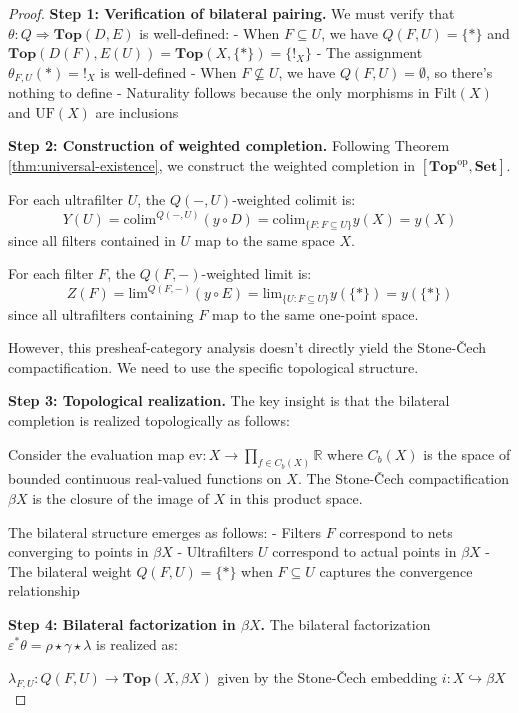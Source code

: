 \documentclass[11pt]{article}
\theoremstyle{plain}
\theoremstyle{definition}
\theoremstyle{remark}
\newcommand{\op}{\mathrm{op}}
\newcommand{\colim}{\mathrm{colim}}
\renewcommand{\lim}{\mathrm{lim}}
\begin{document}
\begin{proof}
\textbf{Step 1: Verification of bilateral pairing.}
We must verify that $\theta : Q \Rightarrow \mathbf{Top}(D, E)$ is well-defined:
- When $F \subseteq U$, we have $Q(F, U) = \{*\}$ and $\mathbf{Top}(D(F), E(U)) = \mathbf{Top}(X, \{*\}) = \{!_X\}$
- The assignment $\theta_{F,U}(*) = !_X$ is well-defined
- When $F \not\subseteq U$, we have $Q(F, U) = \emptyset$, so there's nothing to define
- Naturality follows because the only morphisms in $\mathrm{Filt}(X)$ and $\mathrm{UF}(X)$ are inclusions

\textbf{Step 2: Construction of weighted completion.}
Following Theorem \ref{thm:universal-existence}, we construct the weighted completion in $[\mathbf{Top}^{\op}, \mathbf{Set}]$.

For each ultrafilter $U$, the $Q(-, U)$-weighted colimit is:
$$Y(U) = \colim^{Q(-, U)} (y \circ D) = \colim_{\{F : F \subseteq U\}} y(X) = y(X)$$
since all filters contained in $U$ map to the same space $X$.

For each filter $F$, the $Q(F, -)$-weighted limit is:
$$Z(F) = \lim^{Q(F, -)} (y \circ E) = \lim_{\{U : F \subseteq U\}} y(\{*\}) = y(\{*\})$$
since all ultrafilters containing $F$ map to the same one-point space.

However, this presheaf-category analysis doesn't directly yield the Stone-\v{C}ech compactification. We need to use the specific topological structure.

\textbf{Step 3: Topological realization.}
The key insight is that the bilateral completion is realized topologically as follows:

Consider the evaluation map $\text{ev} : X \to \prod_{f \in C_b(X)} \mathbb{R}$ where $C_b(X)$ is the space of bounded continuous real-valued functions on $X$. The Stone-\v{C}ech compactification $\beta X$ is the closure of the image of $X$ in this product space.

The bilateral structure emerges as follows:
- Filters $F$ correspond to nets converging to points in $\beta X$
- Ultrafilters $U$ correspond to actual points in $\beta X$ 
- The bilateral weight $Q(F, U) = \{*\}$ when $F \subseteq U$ captures the convergence relationship

\textbf{Step 4: Bilateral factorization in $\beta X$.}
The bilateral factorization $\varepsilon^* \theta = \rho \star \gamma \star \lambda$ is realized as:

$\lambda_{F,U} : Q(F, U) \to \mathbf{Top}(X, \beta X)$ given by the Stone-\v{C}ech embedding $i : X \hookrightarrow \beta X$


\end{proof}
\end{document}
